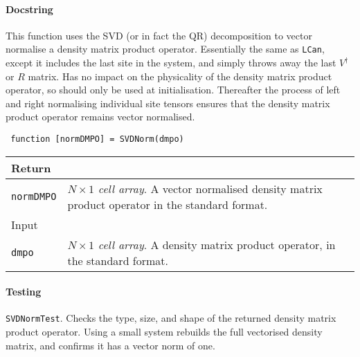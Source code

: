  \paragraph{Docstring} This function uses the SVD (or in fact the QR) decomposition to vector normalise a density matrix product operator. Essentially the same as \lstinline$LCan$, except it includes the last site in the system, and simply throws away the last \(V^{\dagger}\) or \(R\) matrix. Has no impact on the physicality of the density matrix product operator, so should only be used at initialisation. Thereafter the process of left and right normalising individual site tensors ensures that the density matrix product operator remains vector normalised. 
 \begin{lstlisting}
 function [normDMPO] = SVDNorm(dmpo) \end{lstlisting}
 \begin{longtabu}{X[1,l]X[4,l]}
 \hline
 Return & \\ \hline
 \lstinline$normDMPO$ & \emph{\(N \times 1\) cell array}. A vector normalised density matrix product operator in the standard format. \\ \hline
 Input & \\ \hline
 \lstinline$dmpo$ & \emph{\(N \times 1\) cell array}. A density matrix product operator, in the standard format. \\ 
 \hline
 \end{longtabu}
 \paragraph{Testing} \lstinline$SVDNormTest$. Checks the type, size, and shape of the returned density matrix product operator. Using a small system rebuilds the full vectorised density matrix, and confirms it has a vector norm of one.  